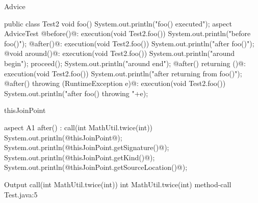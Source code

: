 \begin{frame}[fragile]{Advice}
	\begin{mycolumns}[widths={38,62},animation=none]
	\mynextcolumn
{\small
\begin{codetight}{}
public class Test2 {
	void foo() {
		System.out.println("foo() executed");
	}
}
aspect AdviceTest {
	@before()@: execution(void Test2.foo()) {
		System.out.println("before foo()");
	}
	@after()@: execution(void Test2.foo()) {
		System.out.println("after foo()");
	}
	@void around()@: execution(void Test2.foo()) {
		System.out.println("around begin");
		proceed();
		System.out.println("around end");
	}
	@after() returning ()@: execution(void Test2.foo()) {
		System.out.println("after returning from foo()");
	}
	@after() throwing (RuntimeException e)@: execution(void Test2.foo()) {
		System.out.println("after foo() throwing "+e);
	}
}
\end{codetight}
}
	\end{mycolumns}
\end{frame}

\begin{frame}[fragile]{thisJoinPoint}
	\begin{mycolumns}[widths={30,70},animation=none]
	\mynextcolumn
\begin{codetight}{}
aspect A1 {
	after() : call(int MathUtil.twice(int)) {
		System.out.println(@thisJoinPoint@);
		System.out.println(@thisJoinPoint.getSignature()@);
		System.out.println(@thisJoinPoint.getKind()@);
		System.out.println(@thisJoinPoint.getSourceLocation()@);
	}
}
\end{codetight}
\begin{codetight}{Output}
call(int MathUtil.twice(int))
int MathUtil.twice(int)
method-call
Test.java:5
\end{codetight}
	\end{mycolumns}
\end{frame}

